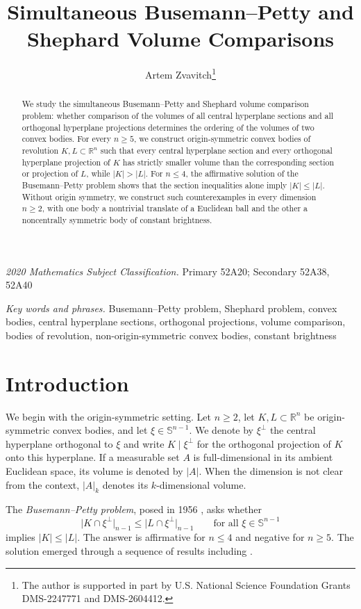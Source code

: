 \documentclass[11pt]{article}
\title{Simultaneous Busemann--Petty and Shephard Volume Comparisons}
\author{Artem Zvavitch\thanks{The author is supported in part by U.S. National Science Foundation
Grants DMS-2247771 and DMS-2604412.}}
\date{}
\theoremstyle{remark}
\newcommand{\R}{\mathbb{R}}
\newcommand{\Sph}{\mathbb{S}}
\providecommand{\subjclass}[2][]{%
  \par\smallskip\noindent
  {\small\textit{#1 Mathematics Subject Classification.} #2\par}}
\providecommand{\keywords}[1]{%
  \par\smallskip\noindent
  {\small\textit{Key words and phrases.} #1\par}}
\begin{document}
\maketitle

\begin{abstract}
We study the simultaneous Busemann--Petty and Shephard volume comparison
problem: whether comparison of the volumes of all central hyperplane sections and all
orthogonal hyperplane projections determines the ordering of the volumes
of two convex bodies.  For every $n\geq5$, we construct
origin-symmetric convex bodies of revolution $K,L\subset\R^n$ such that
every central hyperplane section and every orthogonal hyperplane projection
of $K$ has strictly smaller  volume than the corresponding
section or projection of $L$, while $|K|>|L|$.  For $n\leq4$, the affirmative
solution of the Busemann--Petty problem shows that the section inequalities
alone imply $|K|\leq|L|$.  Without origin symmetry, we construct such counterexamples in every
dimension $n\geq2$, with one body a nontrivial translate of a Euclidean
ball and the other a noncentrally symmetric body of constant brightness.
\end{abstract}

\subjclass[2020]{Primary 52A20; Secondary 52A38, 52A40}
\keywords{Busemann--Petty problem, Shephard problem, convex
bodies, central hyperplane sections, orthogonal projections, volume
comparison, bodies of revolution, non-origin-symmetric convex bodies,
constant brightness}


\section{Introduction}

We begin with the origin-symmetric setting.  Let $n\geq2$, let
$K,L\subset\R^n$ be origin-symmetric convex bodies, and let
$\xi\in\Sph^{n-1}$.  We denote by $\xi^\perp$ the central hyperplane
orthogonal to $\xi$ and write $K\mid\xi^\perp$ for the orthogonal
projection of $K$ onto this hyperplane.  If a measurable set $A$ is
full-dimensional in its ambient Euclidean space, its volume is denoted by
$|A|$.  When the dimension is not clear from the context, $|A|_k$ denotes
its $k$-dimensional volume.

The \emph{Busemann--Petty problem}, posed in 1956
\cite{BusemannPetty}, asks whether
\begin{equation}\label{eq:BP-intro}
 \bigl|K\cap\xi^\perp\bigr|_{n-1}
 \leq \bigl|L\cap\xi^\perp\bigr|_{n-1}
 \qquad\text{for all }\xi\in\Sph^{n-1}
\end{equation}
implies $|K|\leq|L|$.  The answer is affirmative for $n\leq4$ and
negative for $n\geq5$.  The solution emerged through a sequence of results
including
\cite{LarmanRogers,Ball,Bourgain,Giannopoulos1990,Papadimitrakis,
Lutwak,Gardner1994,GardnerKoldobskySchlumprecht,Zhang1999}.
\end{document}
